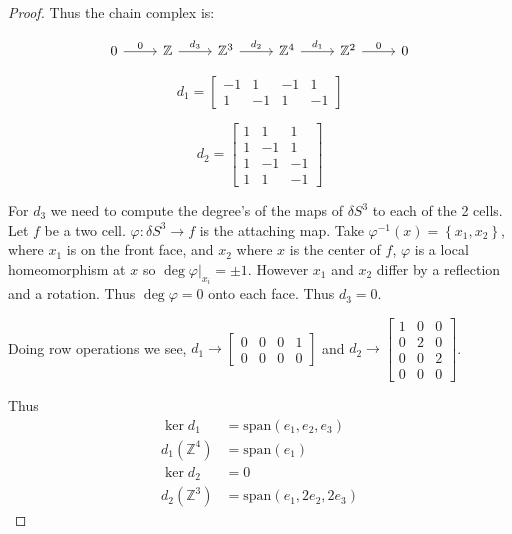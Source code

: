 \documentclass{article}
\newcommand{\Z}{\mathbb{Z}}
\newcommand{\spn}[0]{\text{span}}
\begin{document}
\begin{proof}
    Thus the chain complex is:

\[\begin{tikzcd}
	0 & \Z & {\Z^3} & {\Z^4} & {\Z^2} & 0
	\arrow["0", from=1-1, to=1-2]
	\arrow["{d_3}", from=1-2, to=1-3]
	\arrow["{d_2}", from=1-3, to=1-4]
	\arrow["{d_1}", from=1-4, to=1-5]
	\arrow["0", from=1-5, to=1-6]
\end{tikzcd}\]

    \[d_1 = \begin{bmatrix}
        -1 & 1 & -1 & 1 \\
        1 & -1 & 1 & -1
    \end{bmatrix}\] 

    \[d_2 = \begin{bmatrix}
        1 & 1 & 1 \\
        1 & -1 & 1 \\
        1 & -1 & -1 \\
        1 & 1 & -1
    \end{bmatrix}\] 

    For $d_3$ we need to compute the degree's of the maps of $\delta S^3$ to each of the 2 cells. Let $f$ be a two cell. $\varphi: \delta S^3 \to f$ is the attaching map. Take $\varphi^{-1}(x) = \left\{ x_1, x_2 \right\}$, where $x_1$ is on the front face, and $x_2$    where $x$ is the center of $f$, $\varphi$ is a local homeomorphism at $x$ so $\deg \varphi|_{x_i} = \pm 1$. However $x_1$ and $x_2$ differ by a reflection and a rotation. Thus $\deg \varphi = 0$ onto each face. Thus $d_3 = 0$. 
    
    Doing row operations we see, $d_1 \to \begin{bmatrix}
        0 & 0 & 0 & 1 \\ 0 & 0 & 0 & 0
    \end{bmatrix}$ and $d_2 \to \begin{bmatrix}
        1 & 0 & 0 \\ 0 & 2 & 0 \\ 0 & 0 & 2 \\ 0 & 0 & 0
    \end{bmatrix}$. 
    
    Thus \begin{align*}
        \ker d_1 &= \spn\left(e_1, e_2, e_3\right) \\
        d_1(\Z^4) &= \spn(e_1) \\
        \ker d_2 &= 0 \\
        d_2(\Z^3) &= \spn\left(e_1, 2e_2, 2e_3\right)
    \end{align*}
    

\end{proof}
\end{document}
